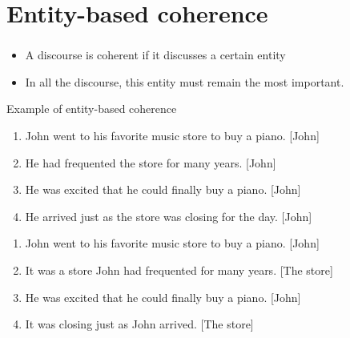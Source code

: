 \documentclass[xcolor=table]{beamer}
\begin{document}
\section{Entity-based coherence}

\begin{frame}
	\frametitle{\insertshortsubtitle}
	\framesubtitle{\insertsection}
	
	\begin{itemize}
		\item A discourse is coherent if it discusses a certain entity
		\item In all the discourse, this entity must remain the most important.
	\end{itemize}

	\begin{exampleblock}{Example of entity-based coherence \cite{2019-jurafsky-martin}}
		\small
		\begin{minipage}{.48\textwidth}
			\begin{enumerate}
				\item John went to his favorite music store to buy a piano. [John]
				\item He had frequented the store for many years. [John]
				\item He was excited that he could finally buy a piano. [John]
				\item He arrived just as the store was closing for the day. [John]
			\end{enumerate}
		\end{minipage}
		\begin{minipage}{.48\textwidth}
			\begin{enumerate}
				\item John went to his favorite music store to buy a piano. [John]
				\item It was a store John had frequented for many years. [The store]
				\item He was excited that he could finally buy a piano. [John]
				\item It was closing just as John arrived. [The store]
			\end{enumerate}
		\end{minipage}
	\end{exampleblock}
	
\end{frame}
\end{document}
